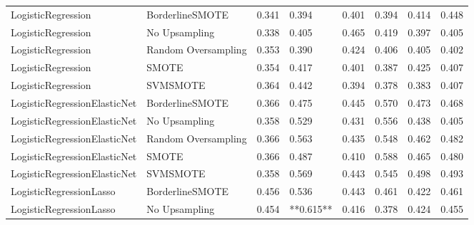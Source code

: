 \begin{tabular}{llllllll}
          LogisticRegression &     BorderlineSMOTE & 0.341 &                     0.394 &                 0.401 &                  0.394 &                                   0.414 &    0.448 \\
          LogisticRegression &       No Upsampling & 0.338 &                     0.405 &                 0.465 &                  0.419 &                                   0.397 &    0.405 \\
          LogisticRegression & Random Oversampling & 0.353 &                     0.390 &                 0.424 &                  0.406 &                                   0.405 &    0.402 \\
          LogisticRegression &               SMOTE & 0.354 &                     0.417 &                 0.401 &                  0.387 &                                   0.425 &    0.407 \\
          LogisticRegression &            SVMSMOTE & 0.364 &                     0.442 &                 0.394 &                  0.378 &                                   0.383 &    0.407 \\
LogisticRegressionElasticNet &     BorderlineSMOTE & 0.366 &                     0.475 &                 0.445 &                  0.570 &                                   0.473 &    0.468 \\
LogisticRegressionElasticNet &       No Upsampling & 0.358 &                     0.529 &                 0.431 &                  0.556 &                                   0.438 &    0.405 \\
LogisticRegressionElasticNet & Random Oversampling & 0.366 &                     0.563 &                 0.435 &                  0.548 &                                   0.462 &    0.482 \\
LogisticRegressionElasticNet &               SMOTE & 0.366 &                     0.487 &                 0.410 &                  0.588 &                                   0.465 &    0.480 \\
LogisticRegressionElasticNet &            SVMSMOTE & 0.358 &                     0.569 &                 0.443 &                  0.545 &                                   0.498 &    0.493 \\
     LogisticRegressionLasso &     BorderlineSMOTE & 0.456 &                     0.536 &                 0.443 &                  0.461 &                                   0.422 &    0.461 \\
     LogisticRegressionLasso &       No Upsampling & 0.454 &                 **0.615** &                 0.416 &                  0.378 &                                   0.424 &    0.455 \\

\end{tabular}
